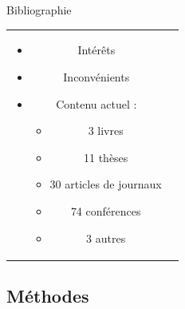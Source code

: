 \documentclass{beamer}
\begin{document}
\begin{frame}{Bibliographie}
\begin{tabular}{c c}
\begin{minipage}{0.6\linewidth}
\begin{itemize}
      \item Intérêts %
      \item Inconvénients
        \vspace{5mm}
      \item<2-> Contenu actuel : %
        \begin{itemize}
        \item 3 livres
        \item 11 thèses
        \item 30 articles de journaux
        \item 74 conférences
        \item 3 autres
        \end{itemize}
      \end{itemize}
    \end{minipage}
  \end{tabular}
\end{frame}

\subsection*{Méthodes}
\end{document}
